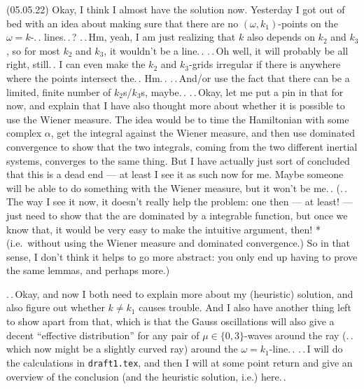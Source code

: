 \documentclass{report}
\begin{document}
(05.05.22) Okay, I think I almost have the solution now. Yesterday I got out of bed with an idea about making sure that there are no $(\omega, k_1)$-points on the $\omega = k$-.\,. lines.\,.\,? .\,.\,Hm, yeah, I am just realizing that $k$ also depends on $k_2$ and $k_3$, so for most $k_2$ and $k_3$, it wouldn't be a line.\,. .\,.\,Oh well, it will probably be all right, still.\,. I can even make the $k_2$ and $k_3$-grids irregular if there is anywhere where the points intersect the.\,. Hm.\,. .\,.\,And/or use the fact that there can be a limited, finite number of $k_2$s/$k_3$s, maybe.\,. .\,.\,Okay, let me put a pin in that for now, and explain that I have also thought more about whether it is possible to use the Wiener measure. The idea would be to time the Hamiltonian with some complex $\alpha$, get the integral against the Wiener measure, and then use dominated convergence to show that the two integrals, coming from the two different inertial systems, converges to the same thing. But I have actually just sort of concluded that this is a dead end --- at least I see it as such now for me. Maybe someone will be able to do something with the Wiener measure, but it won't be me.\,. (.\,.\,The way I see it now, it doesn't really help the problem: one then --- at least! --- just need to show that the are dominated by a integrable function, but once we know that, it would be very easy to make the intuitive argument, then! *(i.e.\ without using the Wiener measure and dominated convergence.) So in that sense, I don't think it helps to go more abstract: you only end up having to prove the same lemmas, and perhaps more.) 

.\,.\,Okay, and now I both need to explain more about my (heuristic) solution, and also figure out whether $k\neq k_1$ causes trouble. And I also have another thing left to show apart from that, which is that the Gauss oscillations will also give a decent ``effective distribution'' for any pair of $\mu\in \{0, 3\}$-waves around the ray (.\,.\,which now might be a slightly curved ray) around the $\omega = k_1$-line.\,. .\,.\,I will do the calculations in \texttt{draft1.tex}, and then I will at some point return and give an overview of the conclusion (and the heuristic solution, i.e.) here.\,. 
\end{document}
